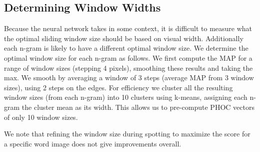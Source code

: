 \documentclass[ms,electronic,twosidetoc,letterpaper,chaptercenter,parttop,lol,lof,lot]{byumsphd}
\begin{document}



\subsection{Determining Window Widths}\label{detirminewindowsize}
Because the neural network takes in some context, it is difficult to measure what the optimal sliding window size should be based on visual width.
Additionally each n-gram is likely to have a different optimal window size. We determine the optimal window size for each n-gram as follows.
We first compute the MAP for a range of window sizes (stepping 4 pixels), smoothing these results and taking the max. We smooth by averaging a window of 3 steps (average MAP from 3 window sizes), using 2 steps on the edges. For efficiency we cluster all the resulting window sizes (from each n-gram) into 10 clusters using k-means, assigning each n-gram the cluster mean as its width. This allows us to pre-compute PHOC vectors of only 10 window sizes.%

We note that refining the window size during spotting to maximize the score for a specific word image does not give improvements overall.
\end{document}
